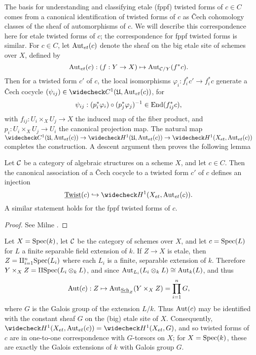 The basis for understanding and classifying etale (fppf) twisted forms of $c\in C$ comes from a canonical identification of twisted forms of $c$ as \v{C}ech cohomology classes of the sheaf of automorphisms of $c$.  We will describe this correspondence here for etale twisted forms of $c$; the correspondence for fppf twisted forms is similar.  For $c\in C$, let $\textnormal{Aut}_{et}(c)$ denote the sheaf on the big etale site of schemes over $X$, defined by
$$\textnormal{Aut}_{et}(c): (f: Y\rightarrow X)\mapsto \textnormal{Aut}_{\mathcal{C}/Y}(f^*c).$$
Then for a twisted form $c'$ of $c$, the local isomorphisms $\varphi_i: f_i^*c'\rightarrow f_i^*c$ generate a \v{C}ech cocycle $(\psi_{ij})\in \wc{C}^1(\mathfrak U,\Aut_{et}(c))$, for
$$\psi_{ij}: (p_i^*\varphi_i)\circ(p_j^*\varphi_j)^{-1}\in \textnormal{End}(f_{ij}^*c),$$
with $f_{ij}: U_i\times_X U_j\rightarrow X$ the induced map of the fiber product, and $p_i: U_i\times_X U_j\rightarrow U_i$ the canonical projection map.  The natural map $\wc{C}^1(\mathfrak U,\Aut_{et}(c))\rightarrow \wc{H}^1(\mathfrak U,\Aut_{et}(c))\rightarrow\wc{H}^1(X_{et},\Aut_{et}(c))$ completes the construction.  A descent argument then proves the following lemma
\begin{lem}\label{twisted form lemma}
Let $\mathcal{C}$ be a category of algebraic structures on a scheme $X$, and let $c\in C$.  Then the canonical association of a \v{C}ech cocycle to a twisted form $c'$ of $c$ defines an injection
$$\twist(c)\hookrightarrow \wc{H}^1(X_{et},\Aut_{et}(c)).$$
A similar statement holds for the fppf twisted forms of $c$.
\end{lem}
\begin{proof}
See Milne \cite{milne1980etale}.
\end{proof}

\begin{ex}
Let $X = \textnormal{Spec}(k)$, let $\mathcal{C}$ be the category of schemes over $X$, and let $c = \textnormal{Spec}(L)$ for $L$ a finite separable field extension of $k$.  If $Z\rightarrow X$ is etale, then $Z = \amalg_{i=1}^n\textnormal{Spec}(L_i)$ where each $L_i$ is a finite, separable extension of $k$.  Therefore $Y\times_X Z = \amalg \textnormal{Spec}(L_i\otimes_k L)$, and since $\textnormal{Aut}_{L_i}(L_i\otimes_k L)\cong \textnormal{Aut}_k(L)$, and thus
$$\textnormal{Aut}(c): Z\mapsto \textnormal{Aut}_{\textnormal{\underline{Sch}}_Z}(Y\times_X Z) = \prod_{i=1}^nG,$$
where $G$ is the Galois group of the extension $L/k$.  Thus $\textnormal{Aut}(c)$ may be identified with the constant sheaf $G$ on the (big) etale site of $X$.  Consequently, $\wc{H}^1(X_{et},\Aut_{et}(c)) = \wc{H}^1(X_{et},G)$, and so twisted forms of $c$ are in one-to-one correspondence with $G$-torsors on $X$; for $X = \textnormal{Spec}(k)$, these are exactly the Galois extensions of $k$ with Galois group $G$.
\end{ex}

